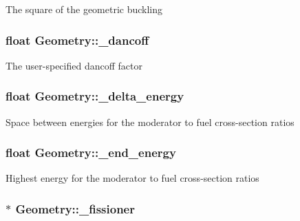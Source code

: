 The square of the geometric buckling \hypertarget{classGeometry_aedfa5e190e5e87f0a0d84ca48278e019}{
\subsubsection[{\-\_\-dancoff}]{\setlength{\rightskip}{0pt plus 5cm}float Geometry\-::\-\_\-dancoff\hspace{0.3cm}{\ttfamily [private]}}}\label{classGeometry_aedfa5e190e5e87f0a0d84ca48278e019}
The user-\/specified dancoff factor \hypertarget{classGeometry_a19f967291b5e54888033a1a52a8fc6a5}{
\subsubsection[{\-\_\-delta\-\_\-energy}]{\setlength{\rightskip}{0pt plus 5cm}float Geometry\-::\-\_\-delta\-\_\-energy\hspace{0.3cm}{\ttfamily [private]}}}\label{classGeometry_a19f967291b5e54888033a1a52a8fc6a5}
Space between energies for the moderator to fuel cross-\/section ratios \hypertarget{classGeometry_a00b1350cc678173b76e8ad06b4916288}{
\subsubsection[{\-\_\-end\-\_\-energy}]{\setlength{\rightskip}{0pt plus 5cm}float Geometry\-::\-\_\-end\-\_\-energy\hspace{0.3cm}{\ttfamily [private]}}}\label{classGeometry_a00b1350cc678173b76e8ad06b4916288}
Highest energy for the moderator to fuel cross-\/section ratios \hypertarget{classGeometry_a5947cd1c6029329ed188ce4b8a8d4e28}{
\subsubsection[{\-\_\-fissioner}]{$\ast$ Geometry\-::\-\_\-fissioner\hspace{0.3cm}{\ttfamily [private]}}}\label{classGeometry_a5947cd1c6029329ed188ce4b8a8d4e28}
